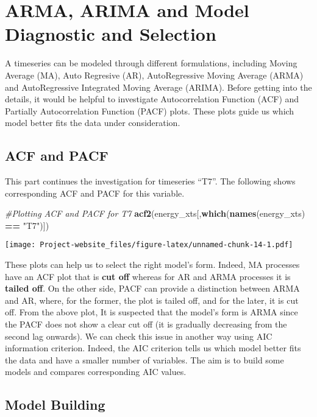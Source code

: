 \documentclass[]{article}
\newenvironment{Shaded}{\begin{snugshade}}{\end{snugshade}}
\newcommand{\KeywordTok}[1]{\textcolor[rgb]{0.13,0.29,0.53}{\textbf{#1}}}
\newcommand{\StringTok}[1]{\textcolor[rgb]{0.31,0.60,0.02}{#1}}
\newcommand{\CommentTok}[1]{\textcolor[rgb]{0.56,0.35,0.01}{\textit{#1}}}
\newcommand{\OperatorTok}[1]{\textcolor[rgb]{0.81,0.36,0.00}{\textbf{#1}}}
\newcommand{\NormalTok}[1]{#1}
\begin{document}
\section{ARMA, ARIMA and Model Diagnostic and
Selection}\label{arma-arima-and-model-diagnostic-and-selection}

A timeseries can be modeled through different formulations, including
Moving Average (MA), Auto Regresive (AR), AutoRegressive Moving Average
(ARMA) and AutoRegressive Integrated Moving Average (ARIMA). Before
getting into the details, it would be helpful to investigate
Autocorrelation Function (ACF) and Partially Autocorrelation Function
(PACF) plots. These plots guide us which model better fits the data
under consideration.

\subsection{ACF and PACF}\label{acf-and-pacf}

This part continues the investigation for timeseries ``T7''. The
following shows corresponding ACF and PACF for this variable.

\begin{Shaded}
\begin{Highlighting}[]
\CommentTok{#Plotting ACF and PACF for T7}
\KeywordTok{acf2}\NormalTok{(energy_xts[,}\KeywordTok{which}\NormalTok{(}\KeywordTok{names}\NormalTok{(energy_xts) }\OperatorTok{==}\StringTok{ "T7"}\NormalTok{)])}
\end{Highlighting}
\end{Shaded}

\texttt{[image: Project-website\_files/figure-latex/unnamed-chunk-14-1.pdf]}

These plots can help us to select the right model's form. Indeed, MA
processes have an ACF plot that is \textbf{cut off} whereas for AR and
ARMA processes it is \textbf{tailed off}. On the other side, PACF can
provide a distinction between ARMA and AR, where, for the former, the
plot is tailed off, and for the later, it is cut off. From the above
plot, It is suspected that the model's form is ARMA since the PACF does
not show a clear cut off (it is gradually decreasing from the second lag
onwards). We can check this issue in another way using AIC information
criterion. Indeed, the AIC criterion tells us which model better fits
the data and have a smaller number of variables. The aim is to build
some models and compares corresponding AIC values.

\subsection{Model Building}\label{model-building}
\end{document}
